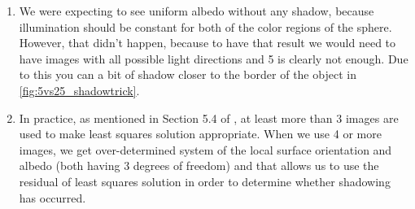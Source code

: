 \documentclass{article}
\begin{document}
\begin{enumerate}
    \item We were expecting to see uniform albedo without any shadow, because illumination should be constant for both of the color regions of the sphere. However, that didn't happen, because to have that result we would need to have images with all possible light directions and 5 is clearly not enough. Due to this you can a bit of shadow closer to the border of the object in \cref{fig:5vs25_shadowtrick}.



    
    \item In practice, as mentioned in Section 5.4 of \cite{cvma}, at least more than 3 images are used to make least squares solution appropriate. When we use 4 or more images, we get over-determined system of the local surface orientation and albedo (both having 3 degrees of freedom) and that allows us to use the residual of least squares solution in order to determine whether shadowing has occurred. 
    
    

\end{enumerate}
\end{document}
